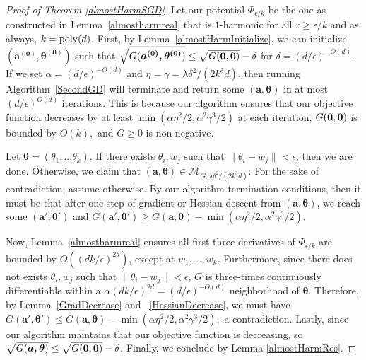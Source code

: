 \begin{proof}[Proof of Theorem \ref{almostHarmSGD}]
  Let our potential $\Phi_{\epsilon/k}$ be the one as constructed in Lemma~\ref{almostharmreal} that is $1$-harmonic for all $r \geq \epsilon/k$ and as always, $k = \mathrm{poly}(d)$.  First, by Lemma~\ref{almostHarmInitialize}, we can initialize $\boldsymbol{(a^{(0)},\theta^{(0)})}$ such that $\sqrt{G(\boldsymbol{a^{(0)},\theta^{(0)}})} \leq \sqrt{G({\bf 0,0})} - \delta$ for $\delta = (d/\epsilon)^{-O(d)}$. If we set $\alpha = (d/\epsilon)^{-O(d)}$ and $\eta = \gamma = \lambda \delta^2/(2k^3d)$, then running Algorithm~\ref{SecondGD} will terminate and return some $(\boldsymbol{a,\theta})$ in at most $(d/\epsilon)^{O(d)}$ iterations. This is because our algorithm ensures that our objective function decreases by at least $\min(\alpha \eta^2/2, \alpha^2\gamma^3/2)$ at each iteration, $G({\bf 0, 0})$ is bounded by $O(k),$ and $G \geq 0$ is non-negative.

Let $\boldsymbol{\theta} = (\theta_1,...\theta_k)$. If there exists $\theta_i, w_j$ such that $\|\theta_i - w_j\| < \epsilon$, then we are done. Otherwise, we claim that $(\boldsymbol{a,\theta}) \in \mathcal{M}_{G,\lambda \delta^2/(2k^3d)}$. For the sake of contradiction, assume otherwise. By our algorithm termination conditions, then it must be that after one step of gradient or Hessian descent from $(\boldsymbol{a,\theta})$, we reach some $(\boldsymbol{a',\theta'})$ and $G(\boldsymbol{a',\theta'}) \geq G(\boldsymbol{a,\theta}) - \min(\alpha\eta^2/2,\alpha^2\gamma^3/2)$.

Now, Lemma~\ref{almostharmreal} ensures all first three derivatives of
$\Phi_{\epsilon/k}$ are bounded by $O((dk/\epsilon)^{2d})$, except at
$w_1,...,w_k$. Furthermore, since there does not exists
$\theta_i, w_j$ such that $\|\theta_i - w_j\| <\epsilon$, $G$ is
three-times continuously differentiable within a
$\alpha (dk/\epsilon)^{2d} = (d/\epsilon)^{-O(d)}$ neighborhood of
$\boldsymbol{\theta}$. Therefore, by Lemma~\ref{GradDecrease} and
~\ref{HessianDecrease}, we must have
$G(\boldsymbol{a',\theta'}) \leq G(\boldsymbol{a,\theta}) -
\min(\alpha\eta^2/2,\alpha^2\gamma^3/2),$ a contradiction. Lastly,
since our algorithm maintains that our objective function is
decreasing, so
$\sqrt{G(\boldsymbol{a,\theta})} \leq \sqrt{G({\bf 0,0})} -
\delta$. Finally, we conclude by Lemma \ref{almostHarmRes}.
\end{proof}

